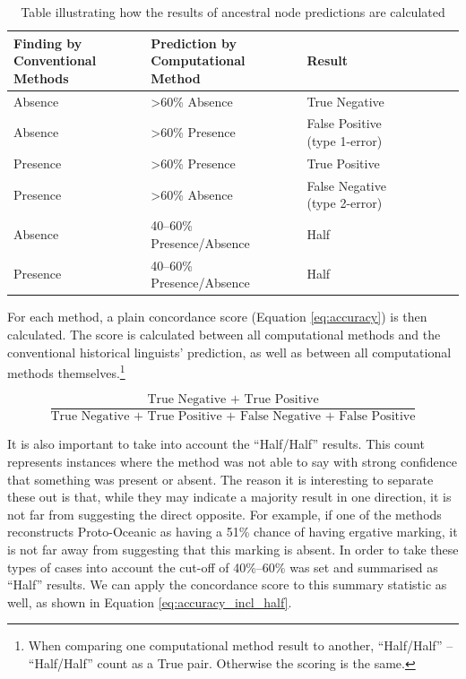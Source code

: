 \documentclass[12pt,letterpaper]{article}
\begin{document}
\begin{table}[ht]
\centering
\caption{Table illustrating how the results of ancestral node predictions are calculated}
\label{example_HL_prediction_table_true_positives}
\begin{tabular}{|p{3cm}|p{5cm}|p{5.5cm}|l|l|l|l|l|}
\hline
\textbf{Finding by Conventional Methods} & \textbf{Prediction by Computational Method} & \textbf{Result} \\ \hline
Absence & >60\% Absence & True Negative \\ \hline
Absence & >60\% Presence & False Positive (type 1-error) \\ \hline
Presence & >60\% Presence & True Positive \\ \hline
Presence & >60\% Absence & False Negative (type 2-error) \\ \hline
Absence & 40--60\% Presence/Absence & Half \\ \hline
Presence & 40--60\% Presence/Absence & Half\\ \hline
\end{tabular}
\end{table}

For each method, a plain concordance score (Equation \eqref{eq:accuracy}) is then calculated. The score is calculated between all computational methods and the conventional historical linguists' prediction, as well as between all computational methods themselves.\footnote{When comparing one computational method result to another, ``Half/Half'' -- ``Half/Half'' count as a True pair. Otherwise the scoring is the same.}

\begin{equation}\label{eq:accuracy}
\frac{\text{True Negative + True Positive}}{\text{True Negative + True Positive + False Negative + False Positive}}
\end{equation}

It is also important to take into account the ``Half/Half'' results. This count represents instances where the method was not able to say with strong confidence that something was present or absent. The reason it is interesting to separate these out is that, while they may indicate a majority result in one direction, it is not far from suggesting the direct opposite. For example, if one of the methods reconstructs Proto-Oceanic as having a 51\% chance of having ergative marking, it is not far away from suggesting that this marking is absent. In order to take these types of cases into account the cut-off of 40\%--60\% was set and summarised as ``Half'' results. We can apply the concordance score to this summary statistic as well, as shown in Equation \eqref{eq:accuracy_incl_half}. 
\end{document}
